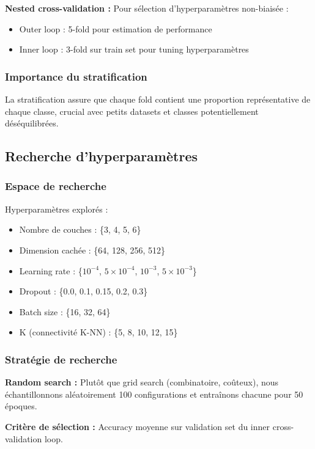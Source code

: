 \textbf{Nested cross-validation :}
Pour sélection d'hyperparamètres non-biaisée :
\begin{itemize}
    \item Outer loop : 5-fold pour estimation de performance
    \item Inner loop : 3-fold sur train set pour tuning hyperparamètres
\end{itemize}

\subsubsection{Importance du stratification}

La stratification assure que chaque fold contient une proportion représentative de chaque classe, crucial avec petits datasets et classes potentiellement déséquilibrées.

\subsection{Recherche d'hyperparamètres}

\subsubsection{Espace de recherche}

Hyperparamètres explorés :
\begin{itemize}
    \item Nombre de couches : \{3, 4, 5, 6\}
    \item Dimension cachée : \{64, 128, 256, 512\}
    \item Learning rate : \{$10^{-4}$, $5 \times 10^{-4}$, $10^{-3}$, $5 \times 10^{-3}$\}
    \item Dropout : \{0.0, 0.1, 0.15, 0.2, 0.3\}
    \item Batch size : \{16, 32, 64\}
    \item K (connectivité K-NN) : \{5, 8, 10, 12, 15\}
\end{itemize}

\subsubsection{Stratégie de recherche}

\textbf{Random search :}
Plutôt que grid search (combinatoire, coûteux), nous échantillonnons aléatoirement 100 configurations et entraînons chacune pour 50 époques.

\textbf{Critère de sélection :}
Accuracy moyenne sur validation set du inner cross-validation loop.

